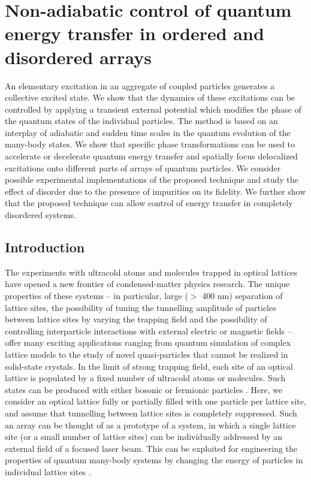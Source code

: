 
\chapter{Non-adiabatic control of quantum energy transfer in ordered and disordered arrays}
\label{ch:wave packet}

An elementary excitation in an aggregate of coupled particles
generates a collective excited state. We show that the dynamics of
these excitations can be controlled by applying a transient external
potential which modifies the phase of the quantum states of the 
individual particles. The method is based on an interplay of
adiabatic and sudden time scales in the quantum evolution of the many-body states. We show that
specific phase transformations can be used to accelerate or
decelerate quantum energy transfer and spatially focus delocalized
excitations onto different parts of  arrays of quantum
particles. {We consider possible experimental implementations of
the proposed technique and study the effect of disorder due to
the presence of impurities on its fidelity. {We further show
that the proposed technique can allow control of energy transfer  in completely disordered systems.}}


\section{Introduction}
\label{sec:energyTransferIntro}

The experiments with ultracold atoms and molecules trapped in optical lattices have opened a new frontier of 
condensed-matter physics research. The unique properties of these systems -- in particular, large ($>$ 400 nm) 
separation of lattice sites, the possibility of tuning the tunnelling amplitude of particles  between lattice sites by
 varying the trapping field and the possibility of controlling interparticle interactions with external electric or 
magnetic fields -- offer many exciting applications ranging from quantum simulation of complex lattice models 
\cite{Kohl2005, Barnett2006, micheli2006, Brennen2007, Buchler2007, McKay2008, Jordens2008, Schneider2008, 
Carr, Carr2, Trefzger2010, Kestner2011, gorshkov, gorshkov2} to the study of novel quasi-particles \cite{biexcitons}
 that cannot be realized in solid-state crystals.
 In the limit of strong trapping field,  each site of an optical lattice is populated by a fixed number of ultracold atoms
 or molecules. 
Such states can be produced with either bosonic or fermionic particles \cite{Greiner2002, Jordens2008}. Here, we consider
 an optical lattice fully or partially filled with one particle per lattice site, and assume that tunnelling between lattice
 sites is completely suppressed. Such an array can be thought of as a prototype  of a  system,
 in which a single lattice site (or a small number of lattice sites) can be individually addressed
by an external field of a focused laser beam. This can be exploited for engineering the properties of quantum 
many-body systems by changing the energy of particles in individual lattice sites \cite{our-2012-prl}.




